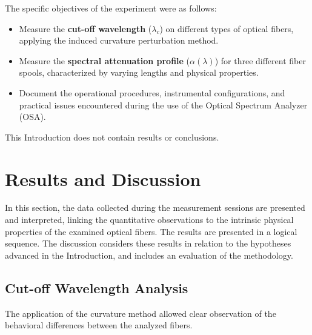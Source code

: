 \documentclass[a4paper,11pt]{article}
\theoremstyle{mythmstyle}
\begin{document}
The specific objectives of the experiment were as follows:
\begin{itemize}
    \item Measure the \textbf{cut-off wavelength} ($\lambda_c$) on different types of optical fibers, applying the induced curvature perturbation method.
    \item Measure the \textbf{spectral attenuation profile} ($\alpha(\lambda)$) for three different fiber spools, characterized by varying lengths and physical properties.
    \item Document the operational procedures, instrumental configurations, and practical issues encountered during the use of the Optical Spectrum Analyzer (OSA).
\end{itemize}
This Introduction does not contain results or conclusions.

\section{Results and Discussion}

In this section, the data collected during the measurement sessions are presented and interpreted, linking the quantitative observations to the intrinsic physical properties of the examined optical fibers. The results are presented in a logical sequence. The discussion considers these results in relation to the hypotheses advanced in the Introduction, and includes an evaluation of the methodology.

\subsection{Cut-off Wavelength Analysis}
The application of the curvature method allowed clear observation of the behavioral differences between the analyzed fibers.
\end{document}
